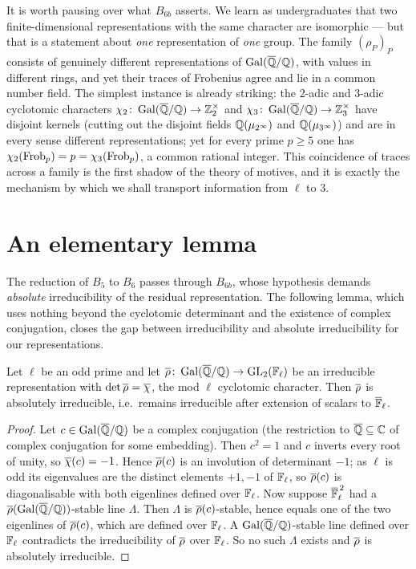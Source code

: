 \documentclass[11pt]{article}
\begin{document}
\begin{remark}
It is worth pausing over what $B_{6b}$ asserts. We learn as undergraduates that
two finite-dimensional representations with the same character are isomorphic
--- but that is a statement about \emph{one} representation of \emph{one} group.
The family $(\rho_P)_P$ consists of genuinely different representations of
$\operatorname{Gal}(\overline{\mathbb{Q}}/\mathbb{Q})$, with values in different rings, and yet their traces of Frobenius agree
and lie in a common number field. The simplest instance is already striking:
the $2$-adic and $3$-adic cyclotomic characters $\chi_2\colon\operatorname{Gal}(\overline{\mathbb{Q}}/\mathbb{Q})\to\mathbb{Z}_2^\times$
and $\chi_3\colon\operatorname{Gal}(\overline{\mathbb{Q}}/\mathbb{Q})\to\mathbb{Z}_3^\times$ have disjoint kernels (cutting out the
disjoint fields $\mathbb{Q}(\mu_{2^\infty})$ and $\mathbb{Q}(\mu_{3^\infty})$) and are in every
sense different representations; yet for every prime $p\geq5$ one has
$\chi_2(\operatorname{Frob}_p)=p=\chi_3(\operatorname{Frob}_p)$, a common rational integer. This
coincidence of traces across a family is the first shadow of the theory of
motives, and it is exactly the mechanism by which we shall transport
information from $\ell$ to $3$.
\end{remark}

\section{An elementary lemma}

The reduction of $B_5$ to $B_6$ passes through $B_{6b}$, whose hypothesis
demands \emph{absolute} irreducibility of the residual representation. The
following lemma, which uses nothing beyond the cyclotomic determinant and the
existence of complex conjugation, closes the gap between irreducibility and
absolute irreducibility for our representations.

\begin{lemma}\label{lem:absirr}
Let $\ell$ be an odd prime and let $\overline{\rho}\colon\operatorname{Gal}(\overline{\mathbb{Q}}/\mathbb{Q})\to\operatorname{GL}_2(\mathbb{F}_\ell)$ be an
irreducible representation with $\det\overline{\rho}=\overline{\chi}$, the mod $\ell$
cyclotomic character. Then $\overline{\rho}$ is absolutely irreducible, i.e.\ remains
irreducible after extension of scalars to $\overline{\mathbb{F}}_\ell$.
\end{lemma}

\begin{proof}
Let $c\in\operatorname{Gal}(\overline{\mathbb{Q}}/\mathbb{Q})$ be a complex conjugation (the restriction to $\overline{\mathbb{Q}}\subseteq\mathbb{C}$
of complex conjugation for some embedding). Then $c^2=1$ and $c$ inverts every
root of unity, so $\overline{\chi}(c)=-1$. Hence $\overline{\rho}(c)$ is an involution of
determinant $-1$; as $\ell$ is odd its eigenvalues are the distinct elements
$+1,-1$ of $\mathbb{F}_\ell$, so $\overline{\rho}(c)$ is diagonalisable with both eigenlines
defined over $\mathbb{F}_\ell$. Now suppose $\overline{\mathbb{F}}_\ell^{\,2}$ had a
$\overline{\rho}(\operatorname{Gal}(\overline{\mathbb{Q}}/\mathbb{Q}))$-stable line $\Lambda$. Then $\Lambda$ is $\overline{\rho}(c)$-stable,
hence equals one of the two eigenlines of $\overline{\rho}(c)$, which are defined over
$\mathbb{F}_\ell$. A $\operatorname{Gal}(\overline{\mathbb{Q}}/\mathbb{Q})$-stable line defined over $\mathbb{F}_\ell$ contradicts the
irreducibility of $\overline{\rho}$ over $\mathbb{F}_\ell$. So no such $\Lambda$ exists and
$\overline{\rho}$ is absolutely irreducible.
\end{proof}
\end{document}
